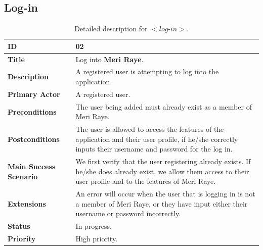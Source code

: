 \documentclass[11pt]{extarticle}
\begin{document}
\subsection{Log-in}
\begin{table}[H]
    \begin{center}
        \begin{tabular}{ |m{6cm}|p{6cm}| } 
           \hline
           \textbf{ID} & 02\\
           \hline
           \textbf{Title} & Log into \textbf{Meri Raye}.\\
           \hline
           \textbf{Description} & A registered user is attempting to log into the application.\\
           \hline
           \textbf{Primary Actor} & A registered user.\\
           \hline
           \textbf{Preconditions} & The user being added must already exist as a member of Meri Raye.\\
           \hline
           \textbf{Postconditions} & The user is allowed to access the features of the application and their user profile, if he/she correctly inputs their username and password for the log in.\\
           \hline
           \textbf{Main Success Scenario} & We first verify that the user registering already exists. If he/she does already exist, we allow them access to their user profile and to the features of Meri Raye.\\
           \hline
           \textbf{Extensions} & An error will occur when the user that is logging in is not a member of Meri Raye, or they have input either their username or password incorrectly.\\
           \hline
           \textbf{Status} & In progress.\\
           \hline
           \textbf{Priority} & High priority.\\
           \hline
        \end{tabular}
    \end{center}
    \caption{\label{tab:Table 2} Detailed description for $<\textit{log-in}>$.}
\end{table}

\newpage
\end{document}
